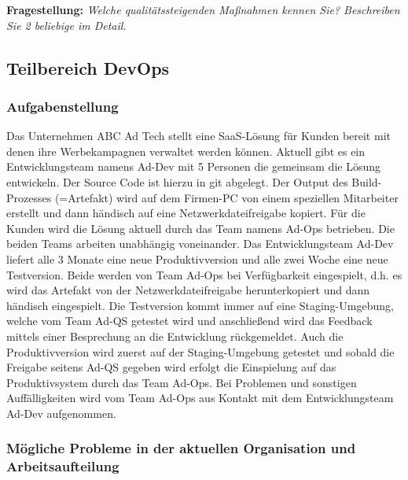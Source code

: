 \textbf{Fragestellung:} \textit{Welche qualitätssteigenden Maßnahmen kennen Sie? Beschreiben Sie 2 beliebige im Detail.}    



\subsection{Teilbereich DevOps}

\subsubsection{Aufgabenstellung}

Das Unternehmen ABC Ad Tech stellt eine SaaS-Lösung für Kunden bereit mit denen ihre
Werbekampagnen verwaltet werden können.
Aktuell gibt es ein Entwicklungsteam namens  Ad-Dev  mit 5 Personen die gemeinsam die
Lösung entwickeln. Der Source Code ist hierzu in git abgelegt. Der Output des Build-Prozesses
(=Artefakt) wird auf dem Firmen-PC von einem speziellen Mitarbeiter erstellt und dann
händisch auf eine Netzwerkdateifreigabe kopiert.
Für die Kunden wird die Lösung aktuell durch das Team namens Ad-Ops betrieben.
Die beiden Teams arbeiten unabhängig voneinander.
Das Entwicklungsteam Ad-Dev liefert alle 3 Monate eine neue Produktivversion und alle
zwei Woche eine neue Testversion. Beide werden von Team Ad-Ops bei Verfügbarkeit
eingespielt, d.h. es wird das Artefakt von der Netzwerkdateifreigabe herunterkopiert und dann
händisch eingespielt. Die Testversion kommt immer auf eine Staging-Umgebung, welche
vom Team Ad-QS getestet wird und anschließend wird das Feedback mittels einer
Besprechung an die Entwicklung rückgemeldet. Auch die Produktivversion wird zuerst auf der
Staging-Umgebung getestet und sobald die Freigabe seitens  Ad-QS  gegeben wird erfolgt die
Einspielung auf das Produktivsystem durch das Team Ad-Ops. Bei Problemen und sonstigen
Auffälligkeiten wird vom Team  Ad-Ops  aus Kontakt mit dem Entwicklungsteam  Ad-Dev 
aufgenommen.\\


\subsubsection{Mögliche Probleme in der aktuellen Organisation und Arbeitsaufteilung}


